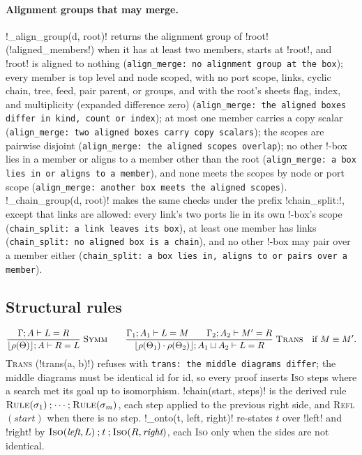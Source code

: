 \paragraph{Alignment groups that may merge.} \py!_align_group(d, root)! returns the alignment group of \code!root! (\py!aligned_members!) when it has at least two members, starts at \code!root!, and \code!root! is aligned to nothing (\texttt{align\_\allowbreak{}merge: no alignment group at the box}); every member is top level and node scoped, with no port scope, links, cyclic chain, tree, feed, pair parent, or groups, and with the root's sheets flag, index, and multiplicity (expanded difference zero) (\texttt{align\_\allowbreak{}merge: the aligned boxes differ in kind,\allowbreak{} count or index}); at most one member carries a copy scalar (\texttt{align\_\allowbreak{}merge: two aligned boxes carry copy scalars}); the scopes are pairwise disjoint (\texttt{align\_\allowbreak{}merge: the aligned scopes overlap}); no other !-box lies in a member or aligns to a member other than the root (\texttt{align\_\allowbreak{}merge: a box lies in or aligns to a member}), and none meets the scopes by node or port scope (\texttt{align\_\allowbreak{}merge: another box meets the aligned scopes}). \py!_chain_group(d, root)! makes the same checks under the prefix \code!chain_split:!, except that links are allowed: every link's two ports lie in its own !-box's scope (\texttt{chain\_\allowbreak{}split: a link leaves its box}), at least one member has links (\texttt{chain\_\allowbreak{}split: no aligned box is a chain}), and no other !-box may pair over a member either (\texttt{chain\_\allowbreak{}split: a box lies in,\allowbreak{} aligns to or pairs over a member}).

\subsection{Structural rules}

\[
\frac{\Gamma;A\vdash L=R}{\lfloor\rho(\Theta)\rfloor;A\vdash R=L}\;\textsc{Symm}
\qquad
\frac{\Gamma_1;A_1\vdash L=M \qquad \Gamma_2;A_2\vdash M'=R}{\lfloor\rho(\Theta_1)\cdot\rho(\Theta_2)\rfloor;A_1\sqcup A_2\vdash L=R}\;\textsc{Trans}\quad\text{if } M\equiv M'.
\]
\textsc{Trans} (\py!trans(a, b)!) refuses with \texttt{trans: the middle diagrams differ}; the middle diagrams must be identical id for id, so every proof inserts \textsc{Iso} steps where a search met its goal up to isomorphism. \py!chain(start, steps)! is the derived rule $\textsc{Rule}(\sigma_1)\mathbin{;}\cdots\mathbin{;}\textsc{Rule}(\sigma_m)$, each step applied to the previous right side, and \textsc{Refl}$(\textit{start})$ when there is no step. \py!_onto(t, left, right)! re-states $t$ over \code!left! and \code!right! by $\textsc{Iso}(\textit{left},L)\mathbin{;}t\mathbin{;}\textsc{Iso}(R,\textit{right})$, each \textsc{Iso} only when the sides are not identical.

